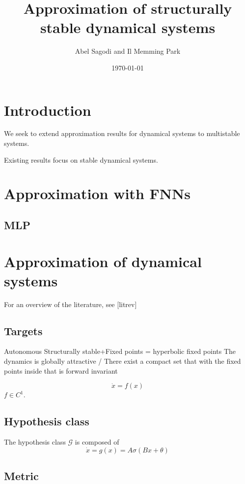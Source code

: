 \documentclass{article}
\title{Approximation of structurally stable dynamical systems}
\author{Abel Sagodi and Il Memming Park}
\date{\today}
\theoremstyle{definition}
\theoremstyle{remark}
\begin{document}
\maketitle

\section{Introduction}
We seek to extend approximation results for dynamical systems to multistable systems.


Existing results focus on stable dynamical systems.


\section{Approximation with FNNs}

\subsection{MLP}%
\citep{cybenko1989approximation,hornik1989multilayer,funahashi1989approximate}



\section{Approximation of dynamical systems}
For an overview of the literature, see [litrev]

\subsection{Targets}
Autonomous
Structurally stable+Fixed points = hyperbolic fixed points
The dynamics is globally attractive / There exist a compact set that with the fixed points inside that is forward invariant 

\begin{equation}
\dot x = f(x)
\end{equation}
$f\in C^1$.

\subsection{Hypothesis class}
The hypothesis class $\mathcal{G}$ is composed of
\begin{equation}
\dot x = g(x) = A\sigma(Bx+\theta)
\end{equation}


\subsection{Metric}
\end{document}
